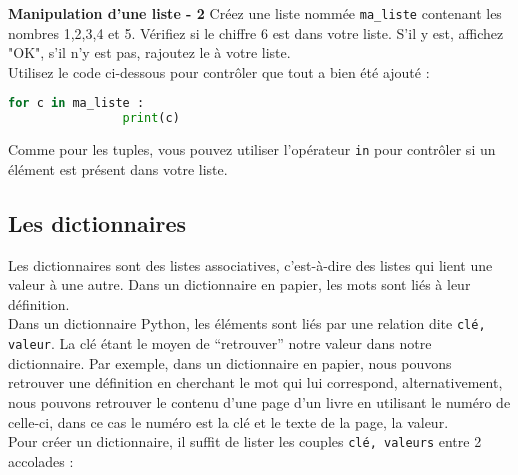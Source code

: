     \begin{Exercice}[5 minutes] \textbf{Manipulation d'une liste - 2}
       Créez une liste nommée \lstinline{ma_liste} contenant les nombres 1,2,3,4 et 5. Vérifiez si le chiffre 6 est dans votre liste. S'il y est, affichez "OK", s'il n'y est pas, rajoutez le à votre liste. \\
       
       Utilisez le code ci-dessous pour contrôler que tout a bien été ajouté : \\
       
       \begin{lstlisting}[language=Python]
            for c in ma_liste :
            	print(c)   \end{lstlisting}
    
        \begin{conseil}
            Comme pour les tuples, vous pouvez utiliser l'opérateur \lstinline{in} pour contrôler si un élément est présent dans votre liste.
        \end{conseil}
        
        \begin{solution}
             
        \end{solution}
    \end{Exercice}

	\subsection{Les dictionnaires}
	Les dictionnaires sont des listes associatives, c’est-à-dire des listes qui lient une valeur à une autre. Dans un dictionnaire en papier, les mots sont liés à leur définition. \\
	
	Dans un dictionnaire Python, les éléments sont liés par une relation dite \lstinline{clé, valeur}. La clé étant le moyen de “retrouver” notre valeur dans notre dictionnaire. Par exemple, dans un dictionnaire en papier, nous pouvons retrouver une définition en cherchant le mot qui lui correspond, alternativement, nous pouvons retrouver le contenu d’une page d’un livre en utilisant le numéro de celle-ci, dans ce cas le numéro est la clé et le texte de la page, la valeur. \\
	
	Pour créer un dictionnaire, il suffit de lister les couples \lstinline{clé, valeurs} entre 2 accolades : \\
	
